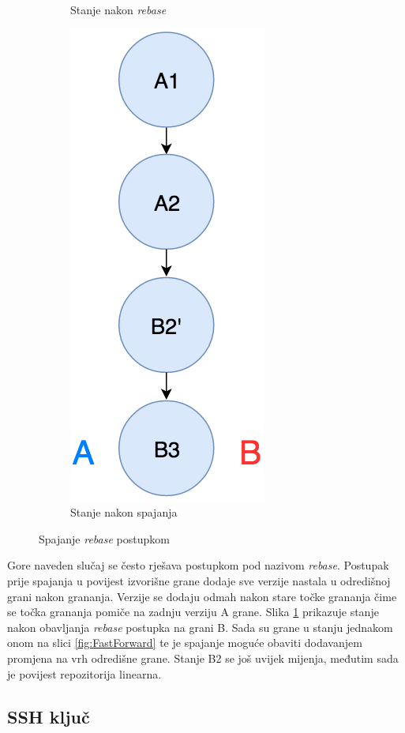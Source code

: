 \documentclass[times, utf8, diplomski, numeric]{fer}
\begin{document}
\begin{appendices}
\begin{figure}[h!]
\begin{subfigure}{.3\textwidth}
\caption{Stanje nakon \textit{rebase}}
\label{fig:RebaseB}
\end{subfigure}
\begin{subfigure}{.3\textwidth}
\centering
\includegraphics[scale=0.5]{RebaseC}
\caption{Stanje nakon spajanja}
\label{fig:RebaseC}
\end{subfigure}
\caption{Spajanje \textit{rebase} postupkom}
\label{fig:Rebase}
\end{figure}

Gore naveden slučaj se često rješava postupkom pod nazivom \textit{rebase}. Postupak prije spajanja u povijest izvorišne grane dodaje sve verzije nastala u odredišnoj grani nakon grananja. Verzije se dodaju odmah nakon stare točke grananja čime se točka grananja pomiče na zadnju verziju A grane. Slika \ref{fig:RebaseB} prikazuje stanje nakon obavljanja \textit{rebase} postupka na grani B. Sada su grane u stanju jednakom onom na slici \ref{fig:FastForward} te je spajanje moguće obaviti dodavanjem promjena na vrh odredišne grane. Stanje B2 se još uvijek mijenja, međutim sada je povijest repozitorija linearna.


\subsection{SSH ključ}


\end{appendices}
\end{document}

